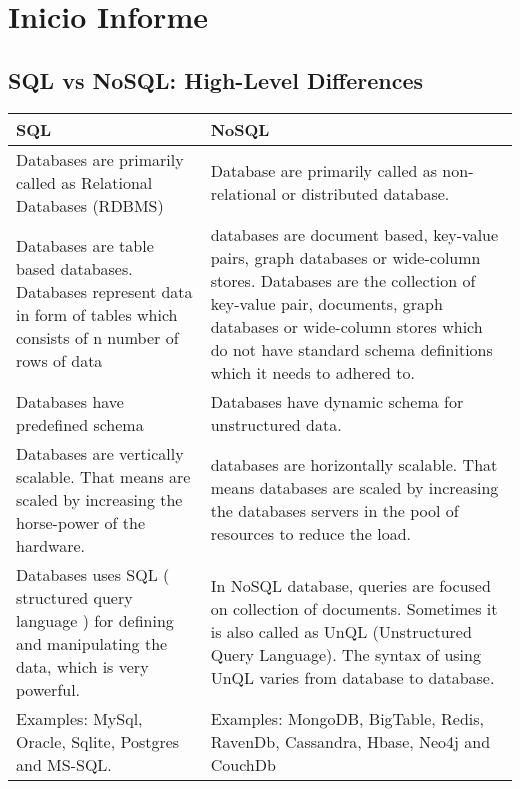 
\chapter{Inicio Informe}\label{cap:inicioInforme}

\section{SQL vs NoSQL: High-Level Differences}\label{cap:antecedentes:datos}


\begin{table}[h!]
    \tiny
   
\begin{tabular}{ |C{0.3\paperwidth}|C{0.3\paperwidth}| }
\hline
SQL & NoSQL \\
\hline
Databases are primarily called as Relational Databases (RDBMS)& 
Database are primarily called as non-relational or distributed database. \\
\hline
Databases are table based databases. Databases represent data in form of tables which consists of n number of rows of data &
databases are document based, key-value pairs, graph databases or wide-column stores. Databases are the collection of key-value pair, documents, graph databases or wide-column stores which do not have standard schema definitions which it needs to adhered to. \\
\hline
Databases have predefined schema &
Databases have dynamic schema for unstructured data.\\
\hline
Databases are vertically scalable. That means are scaled by increasing the horse-power of the hardware. & 
databases are horizontally scalable. That means databases are scaled by increasing the databases servers in the pool of resources to reduce the load.\\
\hline
Databases uses SQL ( structured query language ) for defining and manipulating the data, which is very powerful. &
In NoSQL database, queries are focused on collection of documents. Sometimes it is also called as UnQL (Unstructured Query Language). The syntax of using UnQL varies from database to database. \\ \hline
Examples: MySql, Oracle, Sqlite, Postgres and MS-SQL.&
Examples: MongoDB, BigTable, Redis, RavenDb, Cassandra, Hbase, Neo4j and CouchDb \\
\hline

\end{tabular}
\end{table}
